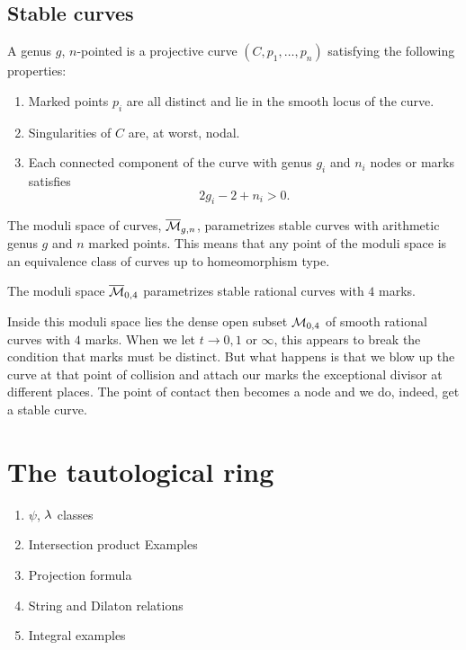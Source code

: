 \documentclass[12pt]{memoir}
\begin{document}
\subsection{Stable curves}
\begin{Def}
    A genus $g$, $n$-pointed  is a projective curve $(C,p_1,\dots,p_n)$ satisfying the following properties:
    \begin{enumerate}
        \item Marked points $p_i$ are all distinct and lie in the smooth locus of the curve.
        \item Singularities of $C$ are, at worst, nodal.
        \item Each connected component of the curve with genus $g_i$ and $n_i$ nodes or marks satisfies 
        $$2g_i-2+n_i>0.$$
    \end{enumerate}
\end{Def}

The moduli space of curves, $\overline{\mathcal{M}}_{g,n}$, parametrizes stable curves with arithmetic genus $g$ and $n$ marked points. This means that any point of the moduli space is an equivalence class of curves up to homeomorphism type. 

\begin{Ex}
The moduli space $\overline{\mathcal{M}}_{0,4}$ parametrizes stable rational curves with $4$ marks.\par 
Inside this moduli space lies the dense open subset $\mathcal{M}_{0,4}$ of smooth rational curves with $4$ marks. 
When we let $t\to 0,1$ or $\infty$, this appears to break the condition that marks must be distinct. But what happens is that we blow up the curve at that point of collision and attach our marks the exceptional divisor at different places. The point of contact then becomes a node and we do, indeed, get a stable curve. 
\end{Ex}

\section{The tautological ring}

\begin{enumerate}
    \item $\psi$, $\lambda$ classes
    \item Intersection product Examples
    \item Projection formula
    \item String and Dilaton relations
    \item Integral examples
\end{enumerate}
\end{document}

